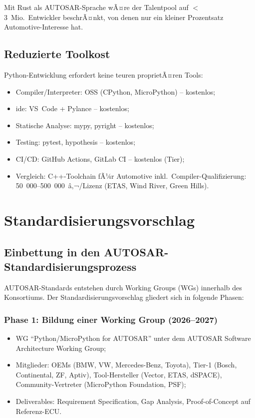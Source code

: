 ﻿\documentclass[12pt,a4paper,twoside]{article}
\begin{document}
Mit Rust als AUTOSAR-Sprache wÃ¤re der Talentpool auf $<$3~Mio.\ Entwickler
beschrÃ¤nkt, von denen nur ein kleiner Prozentsatz Automotive-Interesse hat.

\subsection{Reduzierte Toolkost}
\label{subsec:toolkosten}

Python-Entwicklung erfordert keine teuren proprietÃ¤ren Tools:
\begin{itemize}
  \item Compiler/Interpreter: OSS (CPython, MicroPython) -- kostenlos;
  \item \gls{ide}: VS~Code + Pylance -- kostenlos;
  \item Statische Analyse: mypy, pyright -- kostenlos;
  \item Testing: pytest, hypothesis -- kostenlos;
  \item CI/CD: GitHub Actions, GitLab CI -- kostenlos (Tier);
  \item Vergleich: C++-Toolchain fÃ¼r Automotive inkl.\ Compiler-Qualifizierung:
        50~000--500~000~â‚¬/Lizenz (ETAS, Wind River, Green Hills).
\end{itemize}

\section{Standardisierungsvorschlag}
\label{sec:standardisierung}

\subsection{Einbettung in den AUTOSAR-Standardisierungsprozess}
\label{subsec:standardprozess}

AUTOSAR-Standards entstehen durch Working Groups (WGs) innerhalb des
Konsortiums. Der Standardisierungsvorschlag gliedert sich in folgende Phasen:

\subsubsection{Phase 1: Bildung einer Working Group (2026--2027)}
\begin{itemize}
  \item WG ``Python/MicroPython for AUTOSAR'' unter dem
        AUTOSAR Software Architecture Working Group;
  \item Mitglieder: OEMs (BMW, VW, Mercedes-Benz, Toyota),
        Tier-1 (Bosch, Continental, ZF, Aptiv),
        Tool-Hersteller (Vector, ETAS, dSPACE),
        Community-Vertreter (MicroPython Foundation, PSF);
  \item Deliverables: Requirement Specification, Gap Analysis,
        Proof-of-Concept auf Referenz-ECU.
\end{itemize}
\end{document}
